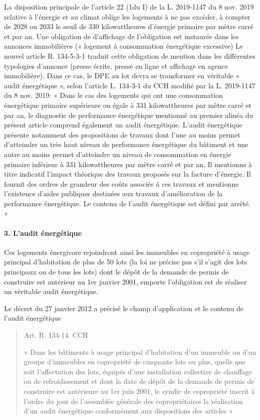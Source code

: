 			La disposition principale de l’article 22 (1\degres du I) de la L. 2019-1147 du 8 nov. 2019 relative à l’énergie et au climat oblige les logements à ne pas excéder, à compter de 2028 ou 2033 le seuil de 330 kilowattheures d’énergie primaire par mètre carré et par an. Une obligation de d’affichage de l’obligation est instaurée dans les annonces immobilières (« logement à consommation énergétique excessive)
			Le nouvel article R. 134-5-3-1 traduit cette obligation de mention dans les différentes typologies d’annonce (presse écrite, presse en ligne et affichage en agence immobilière).
			Dans ce cas, le DPE au lot devra se transformer en véritable « audit énergétique », selon l’article L. 134-3-1 du CCH modifié par la L. 2019-1147 du 8 nov. 2019:
			« Dans le cas des logements qui ont une consommation énergétique primaire supérieure ou égale à 331 kilowattheures par mètre carré et par an, le diagnostic de performance énergétique mentionné au premier alinéa du présent article comprend également un audit énergétique.
			L'audit énergétique présente notamment des propositions de travaux dont l'une au moins permet d'atteindre un très haut niveau de performance énergétique du bâtiment et une autre au moins permet d'atteindre un niveau de consommation en énergie primaire inférieur à 331 kilowattheures par mètre carré et par an. Il mentionne à titre indicatif l'impact théorique des travaux proposés sur la facture d'énergie. Il fournit des ordres de grandeur des coûts associés à ces travaux et mentionne l'existence d'aides publiques destinées aux travaux d'amélioration de la performance énergétique.
			Le contenu de l'audit énergétique est défini par arrêté. »
		
		\paragraph{3. L’audit énergétique}
		
		Ces logements énergivore rejoindront ainsi les immeubles en copropriété à usage principal d’habitation de plus de 50 lots (la loi ne précise pas s’il s’agit des lots principaux ou de tous les lots) dont le dépôt de la demande de permis de construire est antérieur au 1er janvier 2001, emporte l’obligation est de réaliser un véritable audit énergétique.
		
		Le décret du 27 janvier 2012 a précisé le champ d’application et le contenu de l’audit énergétique
		\begin{quote}
			Art. R. 134-14. CCH
			
			« Dans les bâtiments à usage principal d’habitation d’un immeuble ou d’un groupe d’immeubles en copropriété de cinquante lots ou plus, quelle que soit l’affectation des lots, équipés d’une installation collective de chauffage ou de refroidissement et dont la date de dépôt de la demande de permis de construire est antérieure au 1er juin 2001, le syndic de copropriété inscrit à l’ordre du jour de l’assemblée générale des copropriétaires la réalisation d’un audit énergétique conformément aux dispositions des articles »
		\end{quote}
		
